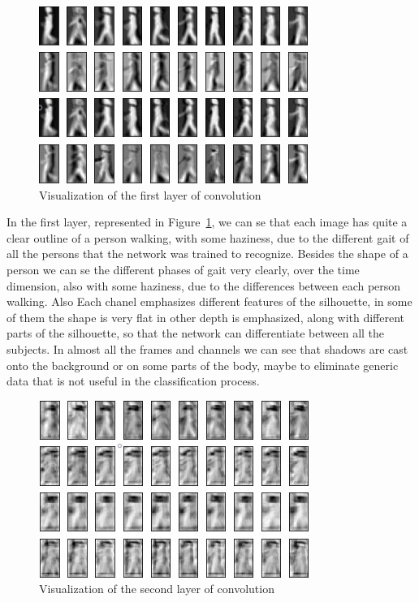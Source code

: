 \documentclass[12pt]{article}
\theoremstyle{definition}
\begin{document}
	\begin{figure}[ht]
		\includegraphics[width=\textwidth]{conv-see/visualization-2.jpg}
		\caption{Visualization of the first layer of convolution}
		\label{figure:visualize-conv-1}
	\end{figure}

	In the first layer, represented in Figure~\ref{figure:visualize-conv-1}, we can se that each image has quite a clear outline of a person walking, with some haziness, due to the different gait of all the persons that the network was trained to recognize. Besides the shape of a person we can se the different phases of gait very clearly, over the time dimension, also with some haziness, due to the differences between each person walking. Also Each chanel emphasizes different features of the silhouette, in some of them the shape is very flat in other depth is emphasized, along with different parts of the silhouette, so that the network can differentiate between all the subjects. In almost all the frames and channels we can see that shadows are cast onto the background or on some parts of the body, maybe to eliminate generic data that is not useful in the classification process.

	\begin{figure}[ht]
		\includegraphics[width=\textwidth]{conv-see/visualization-4.jpg}
		\caption{Visualization of the second layer of convolution}
		\label{figure:visualize-conv-2}
	\end{figure}
\end{document}
